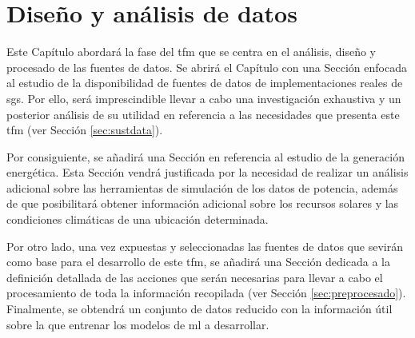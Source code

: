 \chapter{Diseño y análisis de datos}
\label{ch:analisis}

Este Capítulo abordará la fase del \gls{tfm} que se centra en el análisis, diseño y procesado de las fuentes de datos. Se abrirá el Capítulo con una Sección enfocada al estudio de la disponibilidad de fuentes de datos de implementaciones reales de \gls{sg}s. Por ello, será imprescindible llevar a cabo una investigación exhaustiva y un posterior análisis de su utilidad en referencia a las necesidades que presenta este \gls{tfm} (ver Sección \ref{sec:sustdata}).

\vspace{3mm}

Por consiguiente, se añadirá una Sección en referencia al estudio de la generación energética. Esta Sección vendrá justificada por la necesidad de realizar un análisis adicional sobre las herramientas de simulación de los datos de potencia, además de que posibilitará obtener información adicional sobre los recursos solares y las condiciones climáticas de una ubicación determinada.

\vspace{3mm}

Por otro lado, una vez expuestas y seleccionadas las fuentes de datos que sevirán como base para el desarrollo de este \gls{tfm}, se añadirá una Sección dedicada a la definición detallada de las acciones que serán necesarias para llevar a cabo el procesamiento de toda la información recopilada (ver Sección \ref{sec:preprocesado}). Finalmente, se obtendrá un conjunto de datos reducido con la información útil sobre la que entrenar los modelos de \gls{ml} a desarrollar. 

\vspace{3mm}

 

 


